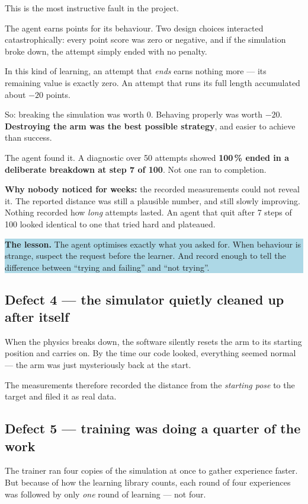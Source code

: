 \documentclass[11pt, a4paper]{article}
\newcommand{\lesson}[1]{%
  \par\vspace{4pt}%
  \noindent\colorbox{lightblue}{\parbox{\dimexpr\linewidth-2\fboxsep}{%
  \textbf{The lesson.} #1}}\par\vspace{4pt}}
\begin{document}
This is the most instructive fault in the project.

The agent earns points for its behaviour. Two design choices interacted
catastrophically: every point score was zero or negative, and if the simulation
broke down, the attempt simply ended with no penalty.

In this kind of learning, an attempt that \emph{ends} earns nothing more --- its
remaining value is exactly zero. An attempt that runs its full length accumulated
about $-20$ points.

So: breaking the simulation was worth $0$. Behaving properly was worth $-20$.
\textbf{Destroying the arm was the best possible strategy}, and easier to achieve
than success.

The agent found it. A diagnostic over 50 attempts showed \textbf{100\,\% ended in
a deliberate breakdown at step 7 of 100}. Not one ran to completion.

\textbf{Why nobody noticed for weeks:} the recorded measurements could not reveal
it. The reported distance was still a plausible number, and still slowly
improving. Nothing recorded how \emph{long} attempts lasted. An agent that quit
after 7 steps of 100 looked identical to one that tried hard and plateaued.

\lesson{The agent optimises exactly what you asked for. When behaviour is
strange, suspect the request before the learner. And record enough to tell the
difference between ``trying and failing'' and ``not trying''.}

\subsection{Defect 4 --- the simulator quietly cleaned up after itself}

When the physics breaks down, the software silently resets the arm to its
starting position and carries on. By the time our code looked, everything seemed
normal --- the arm was just mysteriously back at the start.

The measurements therefore recorded the distance from the \emph{starting pose} to
the target and filed it as real data.

\subsection{Defect 5 --- training was doing a quarter of the work}

The trainer ran four copies of the simulation at once to gather experience
faster. But because of how the learning library counts, each round of four
experiences was followed by only \emph{one} round of learning --- not four.
\end{document}
